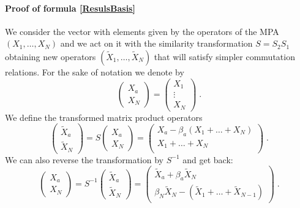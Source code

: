 \documentclass[10pt]{article}
\numberwithin{equation}{section}
\numberwithin{equation}{subsection}
\newcommand{\Xt}{\widetilde{X}}
\newcommand{\dt}{\;.}
\begin{document}
\paragraph{Proof of formula \eqref{ResulsBasis}}  
We consider the vector with elements given by the operators of the MPA $(X_{1},\ldots,X_{N})$ and we act on it with the similarity transformation $S=S_{2}S_{1}$ obtaining new operators $(\Xt_{1},\ldots,\Xt_{N})$ that will satisfy simpler commutation relations. 
For the sake of notation we denote by
\begin{equation}
    \begin{pmatrix}
		X_{a}\\ 
		X_{N}
	\end{pmatrix}=\begin{pmatrix}
	    X_{1}\\
     \vdots\\
     X_{N}
	\end{pmatrix}\dt
\end{equation}
We define the transformed matrix product operators
\begin{equation}\label{Xtildes2b}
	\begin{pmatrix}
		\Xt_{a}\\ 
		\Xt_{N}
	\end{pmatrix} =S\begin{pmatrix}
		X_{a}\\X_{N}
	\end{pmatrix}=\begin{pmatrix} 
		X_{a}-\beta_{a}(X_{1}+\ldots+X_{N})\\
				X_{1}+\ldots +X_{N}\\
	\end{pmatrix}\dt
\end{equation}
We can also reverse the transformation by $S^{-1}$ and get back: 
\begin{equation}\label{Xes}
	\begin{pmatrix}
		X_{a}\\
		X_{N} 
	\end{pmatrix} =S^{-1}\begin{pmatrix}
		\widetilde{X}_{a}\\
		\widetilde{X}_{N}
	\end{pmatrix}=\begin{pmatrix}
		\Xt_{a}+\beta_{a}\Xt_{N}\\ 
		\beta_N\Xt_{N}-(\Xt_{1}+\ldots+\Xt_{N-1})
	\end{pmatrix}\dt
\end{equation}
\end{document}
